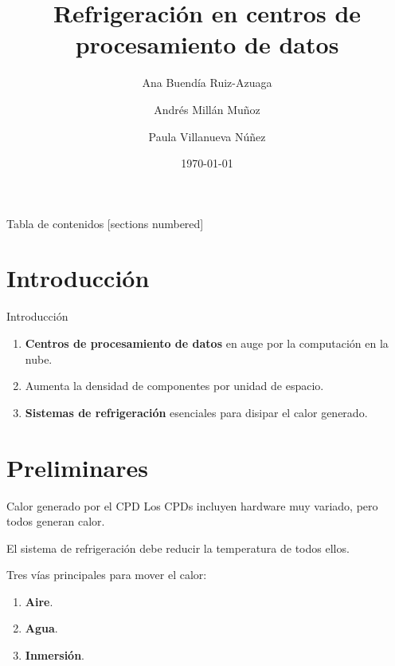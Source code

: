 \documentclass[aspectratio=169, compress]{beamer}
\title{Refrigeración en centros de procesamiento de datos}
\date{\today}
\author{Ana Buendía Ruiz-Azuaga \and Andrés Millán Muñoz \and Paula Villanueva Núñez}
\institute{Universidad de Granada}
\begin{document}
\maketitle

\begin{frame}{Tabla de contenidos}
    [sections numbered]
    \tableofcontents
\end{frame}




\section{Introducción}    

\begin{frame}{Introducción}
    \begin{enumerate}
        \item \textbf{Centros de procesamiento de datos} en auge por la computación en la nube.
        \item Aumenta la densidad de componentes por unidad de espacio.
        \item \textbf{Sistemas de refrigeración} esenciales para disipar el calor generado. 
    \end{enumerate}    
\end{frame}




\section{Preliminares}

\begin{frame}{Calor generado por el CPD}
    Los CPDs incluyen hardware muy variado, pero todos generan calor. 
        
    El sistema de refrigeración debe reducir la temperatura de todos ellos. 

    Tres vías principales para mover el calor:

    \begin{enumerate}
        \item \textbf{Aire}.
        \item \textbf{Agua}.
        \item \textbf{Inmersión}.
    \end{enumerate}
\end{frame}
\end{document}
